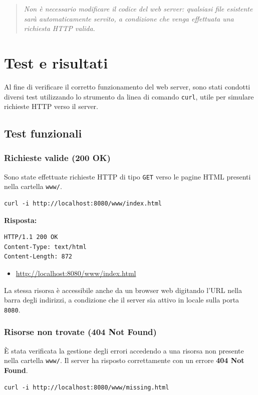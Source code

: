 \documentclass[a4paper,12pt]{report}
\begin{document}
\begin{quote}
    \textit{Non è necessario modificare il codice del web server: qualsiasi file esistente sarà automaticamente servito, a condizione che venga effettuata una richiesta HTTP valida.}
\end{quote}


\chapter{Test e risultati}
Al fine di verificare il corretto funzionamento del web server, sono stati condotti diversi test utilizzando lo strumento da linea di comando \texttt{curl}, utile per simulare
richieste HTTP verso il server.

\section{Test funzionali}
\subsection{Richieste valide (200 OK)}
Sono state effettuate richieste HTTP di tipo \texttt{GET} verso le pagine HTML presenti nella cartella \texttt{www/}.

\begin{verbatim}
curl -i http://localhost:8080/www/index.html
\end{verbatim}

\textbf{Risposta:}
\begin{verbatim}
HTTP/1.1 200 OK
Content-Type: text/html
Content-Length: 872
\end{verbatim}

\begin{itemize}
    \item \url{http://localhost:8080/www/index.html}
\end{itemize}
La stessa risorsa è accessibile anche da un browser web digitando l’URL nella barra degli indirizzi, a condizione che il server sia attivo in locale sulla porta \texttt{8080}.

\newpage
\subsection{Risorse non trovate (404 Not Found)}
È stata verificata la gestione degli errori accedendo a una risorsa non presente nella cartella \texttt{www/}. Il server ha risposto correttamente con un errore \textbf{404 Not Found}.
\begin{verbatim}
curl -i http://localhost:8080/www/missing.html
\end{verbatim}
\end{document}
